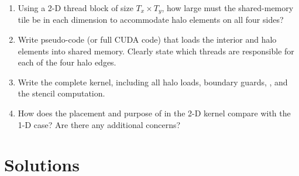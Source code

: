 \begin{ppexercises}
{  \begin{enumerate}[label=(\alph*)]
    \item Using a 2-D thread block of size $T_x \times T_y$, how large must the shared-memory tile be in each dimension to accommodate halo elements on all four sides?
    \item Write pseudo-code (or full CUDA code) that loads the interior and halo elements into shared memory. Clearly state which threads are responsible for each of the four halo edges.
    \item Write the complete  kernel, including all halo loads, boundary guards, , and the stencil computation.
    \item How does the placement and purpose of  in the 2-D kernel compare with the 1-D case? Are there any additional concerns?
  \end{enumerate}
}

\end{ppexercises}

\section*{Solutions}

